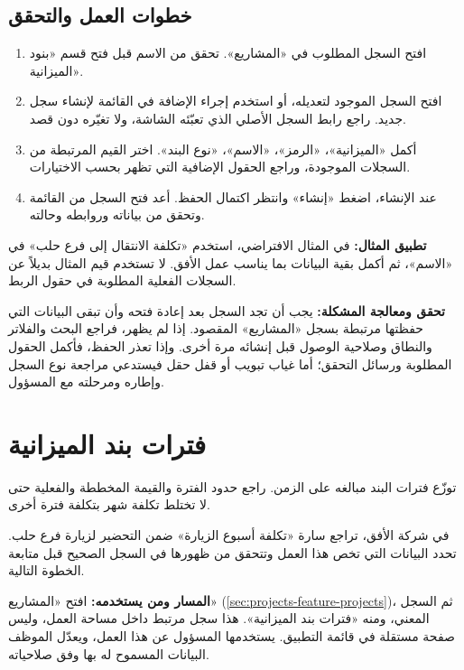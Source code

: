 \subsection{خطوات العمل والتحقق}
\begin{enumerate}
\item افتح السجل المطلوب في «المشاريع». تحقق من الاسم قبل فتح قسم «بنود الميزانية».
\item افتح السجل الموجود لتعديله، أو استخدم إجراء الإضافة في القائمة لإنشاء سجل جديد. راجع رابط السجل الأصلي الذي تعبّئه الشاشة، ولا تغيّره دون قصد.
\item أكمل «الميزانية»، «الرمز»، «الاسم»، «نوع البند». اختر القيم المرتبطة من السجلات الموجودة، وراجع الحقول الإضافية التي تظهر بحسب الاختيارات.
\item عند الإنشاء، اضغط «إنشاء» وانتظر اكتمال الحفظ. أعد فتح السجل من القائمة وتحقق من بياناته وروابطه وحالته.
\end{enumerate}

\textbf{تطبيق المثال:} في المثال الافتراضي، استخدم «تكلفة الانتقال إلى فرع حلب» في «الاسم»، ثم أكمل بقية البيانات بما يناسب عمل الأفق. لا تستخدم قيم المثال بديلاً عن السجلات الفعلية المطلوبة في حقول الربط.

\textbf{تحقق ومعالجة المشكلة:} يجب أن تجد السجل بعد إعادة فتحه وأن تبقى البيانات التي حفظتها مرتبطة بسجل «المشاريع» المقصود. إذا لم يظهر، فراجع البحث والفلاتر والنطاق وصلاحية الوصول قبل إنشائه مرة أخرى. وإذا تعذر الحفظ، فأكمل الحقول المطلوبة ورسائل التحقق؛ أما غياب تبويب أو قفل حقل فيستدعي مراجعة نوع السجل وإطاره ومرحلته مع المسؤول.

\clearpage
\section{فترات بند الميزانية}
\label{sec:projects-feature-budget-line-periods}

توزّع فترات البند مبالغه على الزمن. راجع حدود الفترة والقيمة المخططة والفعلية حتى لا تختلط تكلفة شهر بتكلفة فترة أخرى.

\begin{rcnote}
في شركة الأفق، تراجع سارة «تكلفة أسبوع الزيارة» ضمن التحضير لزيارة فرع حلب. تحدد البيانات التي تخص هذا العمل وتتحقق من ظهورها في السجل الصحيح قبل متابعة الخطوة التالية.
\end{rcnote}

\textbf{المسار ومن يستخدمه:} افتح «المشاريع» (\ref{sec:projects-feature-projects})، ثم السجل المعني، ومنه «فترات بند الميزانية». هذا سجل مرتبط داخل مساحة العمل، وليس صفحة مستقلة في قائمة التطبيق. يستخدمها المسؤول عن هذا العمل، ويعدّل الموظف البيانات المسموح له بها وفق صلاحياته.

